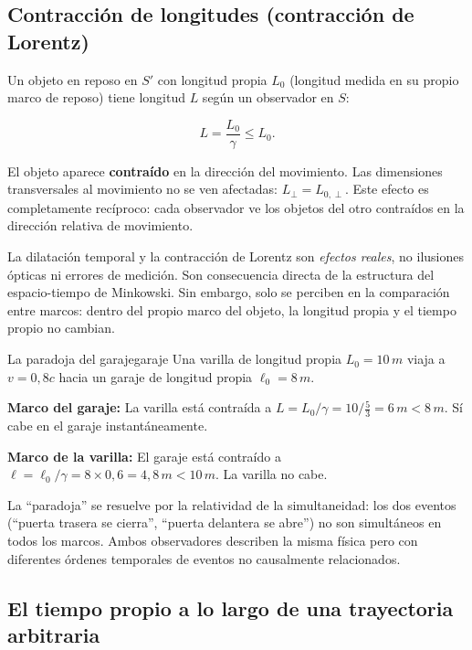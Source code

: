 \subsection{Contracción de longitudes (contracción de Lorentz)}

Un objeto en reposo en $S'$ con longitud propia $L_0$ (longitud medida en su propio marco de reposo) tiene longitud $L$ según un observador en $S$:

\begin{equation}
  L = \frac{L_0}{\gamma} \leq L_0.
  \label{eq:contraccion}
\end{equation}

El objeto aparece \textbf{contraído} en la dirección del movimiento. Las dimensiones transversales al movimiento no se ven afectadas: $L_\perp = L_{0,\perp}$. Este efecto es completamente recíproco: cada observador ve los objetos del otro contraídos en la dirección relativa de movimiento.

\begin{importante}
La dilatación temporal y la contracción de Lorentz son \emph{efectos reales}, no ilusiones ópticas ni errores de medición. Son consecuencia directa de la estructura del espacio-tiempo de Minkowski. Sin embargo, solo se perciben en la comparación entre marcos: dentro del propio marco del objeto, la longitud propia y el tiempo propio no cambian.
\end{importante}

\begin{ejemplo}{La paradoja del garaje}{garaje}
Una varilla de longitud propia $L_0 = 10\,\si{m}$ viaja a $v = 0{,}8c$ hacia un garaje de longitud propia $\ell_0 = 8\,\si{m}$.

\textbf{Marco del garaje:} La varilla está contraída a $L = L_0/\gamma = 10/\frac{5}{3} = 6\,\si{m} < 8\,\si{m}$. Sí cabe en el garaje instantáneamente.

\textbf{Marco de la varilla:} El garaje está contraído a $\ell = \ell_0/\gamma = 8 \times 0{,}6 = 4{,}8\,\si{m} < 10\,\si{m}$. La varilla no cabe.

La ``paradoja'' se resuelve por la relatividad de la simultaneidad: los dos eventos (``puerta trasera se cierra'', ``puerta delantera se abre'') no son simultáneos en todos los marcos. Ambos observadores describen la misma física pero con diferentes órdenes temporales de eventos no causalmente relacionados.
\end{ejemplo}

\subsection{El tiempo propio a lo largo de una trayectoria arbitraria}


